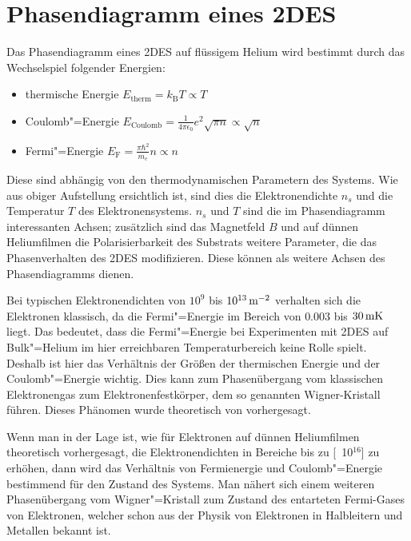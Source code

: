 \section{Phasendiagramm eines 2DES}
\label{sec:theo_phasendiagramm}

Das Phasendiagramm eines 2DES auf flüssigem Helium wird bestimmt durch das Wechselspiel folgender Energien:
\begin{itemize}
	\item thermische Energie $E_\text{therm}=k_\text{B}T \propto T\quad$
	\item Coulomb"=Energie $E_\text{Coulomb}=\frac1{4\pi\epsilon_0} e^2\sqrt{\pi n} \propto \sqrt{n}\quad$
	\item Fermi"=Energie $E_\text{F}=\frac{\pi\hbar^2}{m_e}n\propto n$
\end{itemize}
Diese sind abhängig von den thermodynamischen Parametern des Systems. Wie aus obiger Aufstellung ersichtlich ist, sind dies die Elektronendichte $n_s$ und die Temperatur $T$ des Elektronensystems. $n_s$ und $T$ sind die im Phasendiagramm interessanten Achsen; zusätzlich sind das Magnetfeld $B$ und auf dünnen Heliumfilmen die Polarisierbarkeit des Substrats weitere Parameter, die das Phasenverhalten des 2DES modifizieren. Diese können als weitere Achsen des Phasendiagramms dienen.

Bei typischen Elektronendichten von $10^{9}$ bis $\unit[10^{13}]{\Em}$ verhalten sich die Elektronen klassisch, da die Fermi"=Energie im Bereich von $0.003$ bis $\unit[30]{mK}$ liegt. Das bedeutet, dass die Fermi"=Energie bei Experimenten mit 2DES auf Bulk"=Helium im hier erreichbaren Temperaturbereich keine Rolle spielt. Deshalb ist hier das Verhältnis der Größen der thermischen Energie und der Coulomb"=Energie wichtig. Dies kann zum Phasenübergang vom klassischen Elektronengas zum Elektronenfestkörper, dem so genannten Wigner-Kristall führen. Dieses Phänomen wurde theoretisch von  \cite{Wig34} vorhergesagt.

Wenn man in der Lage ist, wie für Elektronen auf dünnen Heliumfilmen theoretisch vorhergesagt, die Elektronendichten in Bereiche bis zu \unit[10$^{16}$]{\Em}  zu erhöhen, dann wird das Verhältnis von Fermienergie und Coulomb"=Energie bestimmend für den Zustand des Systems. Man nähert sich einem weiteren Phasenübergang vom Wigner"=Kristall zum Zustand des entarteten Fermi-Gases von Elektronen, welcher schon aus der Physik von Elektronen in Halbleitern und Metallen bekannt ist.

